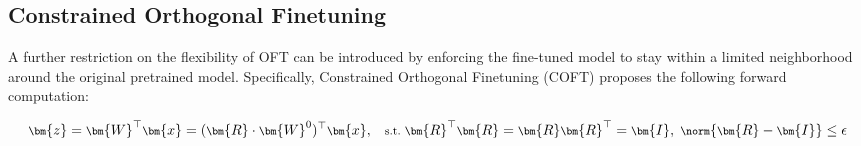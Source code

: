 \subsection{Constrained Orthogonal Finetuning}

A further restriction on the flexibility of OFT can be introduced by enforcing the fine-tuned model to stay within a limited neighborhood around the original pretrained model. Specifically, Constrained Orthogonal Finetuning (COFT) proposes the following forward computation:

\begin{equation}\label{eq:coft_general}
    \footnotesize
    \bm{z}=\bm{W}^\top\bm{x}=(\bm{R}\cdot\bm{W}^0)^\top\bm{x},~~~\text{s.t.}~\bm{R}^\top\bm{R}=\bm{R}\bm{R}^\top=\bm{I},~\norm{\bm{R}-\bm{I}}\leq \epsilon
\end{equation}

